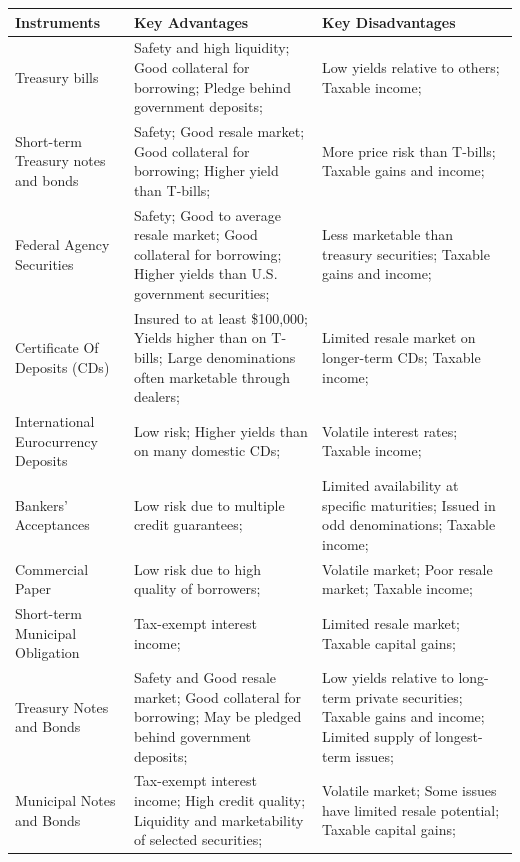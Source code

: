 \begin{table}[htbp]
    \centering
    \renewcommand{\arraystretch}{1.3}
    \begin{tabularx}{\textwidth}{|X|X|X|}
    \hline
    \textbf{Instruments} & \textbf{Key Advantages} & \textbf{Key Disadvantages} \\
    \hline
    Treasury bills & Safety and high liquidity; Good collateral for borrowing; Pledge behind government deposits; & Low yields relative to others; Taxable income; \\
    \hline
    Short-term Treasury notes and bonds & Safety; Good resale market; Good collateral for borrowing; Higher yield than T-bills; & More price risk than T-bills; Taxable gains and income; \\
    \hline
    Federal Agency Securities & Safety; Good to average resale market; Good collateral for borrowing; Higher yields than U.S. government securities; & Less marketable than treasury securities; Taxable gains and income; \\
    \hline
    Certificate Of Deposits (CDs) & Insured to at least \$100{,}000; Yields higher than on T-bills; Large denominations often marketable through dealers; & Limited resale market on longer-term CDs; Taxable income; \\
    \hline
    International Eurocurrency Deposits & Low risk; Higher yields than on many domestic CDs; & Volatile interest rates; Taxable income; \\
    \hline
    Bankers’ Acceptances & Low risk due to multiple credit guarantees; & Limited availability at specific maturities; Issued in odd denominations; Taxable income; \\
    \hline
    Commercial Paper & Low risk due to high quality of borrowers; & Volatile market; Poor resale market; Taxable income; \\
    \hline
    Short-term Municipal Obligation & Tax-exempt interest income; & Limited resale market; Taxable capital gains; \\
    \hline
    Treasury Notes and Bonds & Safety and Good resale market; Good collateral for borrowing; May be pledged behind government deposits; & Low yields relative to long-term private securities; Taxable gains and income; Limited supply of longest-term issues; \\
    \hline
    Municipal Notes and Bonds & Tax-exempt interest income; High credit quality; Liquidity and marketability of selected securities; & Volatile market; Some issues have limited resale potential; Taxable capital gains; \\

\end{tabularx}
\end{table}
